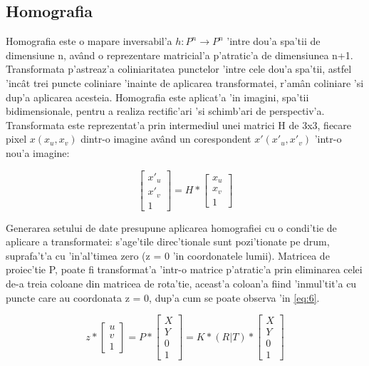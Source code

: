 \documentclass[12pt,a4paper,twoside]{report}
\begin{document}
\subsection{Homografia}
\label{ch:homografie}
Homografia este o mapare inversabil'a $h:P^n \rightarrow P^n$ 'intre dou'a spa'tii de dimensiune n, av\^and o reprezentare matricial'a p'atratic'a de dimensiunea n+1. Transformata p'astreaz'a coliniaritatea punctelor 'intre cele dou'a spa'tii, astfel 'inc\^at trei puncte  coliniare 'inainte de aplicarea transformatei, r'am\^an coliniare 'si dup'a aplicarea acesteia. Homografia este aplicat'a 'in imagini, spa'tii bidimensionale, pentru a realiza rectific'ari 'si schimb'ari de perspectiv'a. Transformata este reprezentat'a prin intermediul unei matrici H de 3x3, fiecare pixel $x(x_u,x_v)$ dintr-o imagine av\^and un corespondent $x'(x'_u,x'_v)$ 'intr-o nou'a imagine:
  
\begin{equation}
\begin{bmatrix}
	x'_u\\
	x'_v\\
	1
\end{bmatrix}
= H * \begin{bmatrix}
	x_u\\
	x_v\\
	1
\end{bmatrix}
\end{equation}

Generarea setului de date presupune aplicarea homografiei cu o condi'tie de aplicare a transformatei: s'age'tile direc'tionale sunt pozi'tionate pe drum, suprafa't'a cu 'in'al'timea zero (z = 0 'in coordonatele lumii). Matricea de proiec'tie P, poate fi transformat'a 'intr-o matrice p'atratic'a prin eliminarea celei de-a treia coloane din matricea de rota'tie, aceast'a coloan'a fiind 'inmul'tit'a cu puncte care au coordonata z = 0, dup'a cum se poate observa 'in \ref{eq:6}.

\begin{equation}
z * \begin{bmatrix}
	u \\
	v \\
	1
	\end{bmatrix}
= P
* \begin{bmatrix}
	X\\
	Y\\
	0\\
	1
\end{bmatrix}
= K * (R|T)
* \begin{bmatrix}
	X\\
	Y\\
	0\\
	1
\end{bmatrix}
\label{eq:5}
\end{equation}
\end{document}
